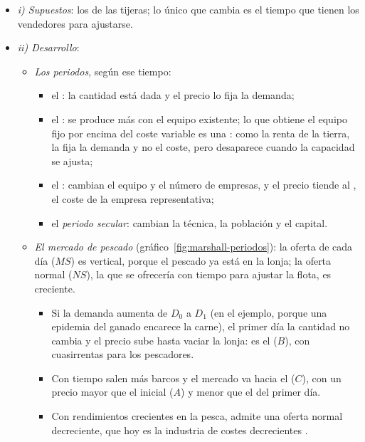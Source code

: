 \documentclass[11pt]{article}
\begin{document}
\begin{itemize}
\item \emph{i) Supuestos}: los de las tijeras; lo único que cambia es el tiempo que tienen los vendedores para ajustarse.
\item \emph{ii) Desarrollo}:
  \begin{itemize}
  \item \emph{Los periodos}, según ese tiempo\nocite{Marshall1890Principles}:
    \begin{itemize}
    \item el : la cantidad está dada y el precio lo fija la demanda;
    \item el : se produce más con el equipo existente; lo que obtiene el equipo fijo por encima del coste variable es una : como la renta de la tierra, la fija la demanda y no el coste, pero desaparece cuando la capacidad se ajusta\nocite{Marshall1890Principles};
    \item el : cambian el equipo y el número de empresas, y el precio tiende al , el coste de la empresa representativa;
    \item el \emph{periodo secular}: cambian la técnica, la población y el capital.
    \end{itemize}
  \item \emph{El mercado de pescado}\nocite{Marshall1890Principles} (gráfico~\ref{fig:marshall-periodos}): la oferta de cada día ($MS$) es vertical, porque el pescado ya está en la lonja; la oferta normal ($NS$), la que se ofrecería con tiempo para ajustar la flota, es creciente.
    \begin{itemize}
    \item Si la demanda aumenta de $D_0$ a $D_1$ (en el ejemplo, porque una epidemia del ganado encarece la carne), el primer día la cantidad no cambia y el precio sube hasta vaciar la lonja: es el  ($B$), con cuasirrentas para los pescadores.
    \item Con tiempo salen más barcos y el mercado va hacia el  ($C$), con un precio mayor que el inicial ($A$) y menor que el del primer día.
    \item Con rendimientos crecientes en la pesca,  admite una oferta normal decreciente\nocite{Marshall1890Principles}, que hoy es la industria de costes decrecientes .
    \end{itemize}

\end{itemize}
\end{itemize}
\end{document}
